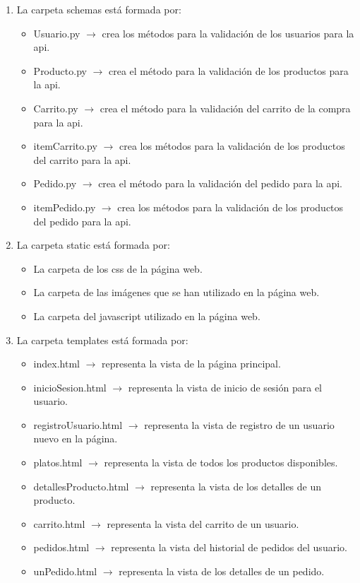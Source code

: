 \documentclass[10pt]{book}
\begin{document}
\begin{enumerate}
\begin{itemize}
            \end{itemize}
        \item La carpeta schemas está formada por:
            \begin{itemize}
                \item Usuario.py $\rightarrow$ crea los métodos para la validación de los usuarios para la api.
                \item Producto.py $\rightarrow$ crea el método para la validación de los productos para la api.
                \item Carrito.py $\rightarrow$ crea el método para la validación del carrito de la compra para la api.
                \item itemCarrito.py $\rightarrow$ crea los métodos para la validación de los productos del carrito para la api.
                \item Pedido.py $\rightarrow$ crea el método para la validación del pedido para la api.
                \item itemPedido.py $\rightarrow$ crea los métodos para la validación de los productos del pedido para la api.
            \end{itemize}
        \item  La carpeta static está formada por:
            \begin{itemize}
                \item La carpeta de los css de la página web.
                \item La carpeta de las imágenes que se han utilizado en la página web.
                \item La carpeta del javascript utilizado en la página web.
            \end{itemize}
            
        \item La carpeta templates está formada por:
            \begin{itemize}
                \item index.html $\rightarrow$ representa la vista de la página principal.
                \item inicioSesion.html $\rightarrow$ representa la vista de inicio de sesión para el usuario.
                \item registroUsuario.html $\rightarrow$ representa la vista de registro de un usuario nuevo en la página.
                \item platos.html $\rightarrow$ representa la vista de todos los productos disponibles.
                \item detallesProducto.html $\rightarrow$ representa la vista de los detalles de un producto.
                \item carrito.html $\rightarrow$ representa la vista del carrito de un usuario.
                \item pedidos.html $\rightarrow$ representa la vista del historial de pedidos del usuario.
                \item unPedido.html $\rightarrow$ representa la vista de los detalles de un pedido.
            \end{itemize}


\end{enumerate}
\end{document}
